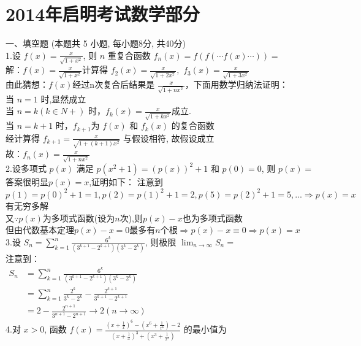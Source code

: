 \documentclass[a4paper,11pt,UTF8]{article}
\begin{document}
\section*{2014年启明考试数学部分}
\noindent
一、填空题 (本题共 5 小题, 每小题8分, 共40分)\\
1.设 $\displaystyle f(x)=\frac{x}{\sqrt{1+x^2}}$, 则 $n$ 重复合函数 $f_n(x)=f(f(\cdots f(x) \cdots))=$\\
解：$\displaystyle f(x)=\frac x{\sqrt{1+x^2}}$计算得 $\displaystyle f_2(x)=\frac x{\sqrt{1+2x^2}},$
$\displaystyle f_3(x)=\frac x{\sqrt{1+3x^2}}$\\
由此猜想：$f(x)$经过n次复合后结果是 $\displaystyle\frac x{\sqrt{1+nx^2}}$，下面用数学归纳法证明：\\
当 $n=1$ 时,显然成立\\
当 $n=k(k{\in}N+)$ 时，$\displaystyle f_k(x)=\frac x{\sqrt{1+kx^2}}$成立.\\
当 $n=k+1$ 时，$f_{k+1}$为 $f(x)$ 和 $f_{k}(x)$ 的复合函数\\
经计算得 $\displaystyle f_{k+1}=\frac{x}{\sqrt{1+(k+1)x^2}}$ 与假设相符,
故假设成立\\
故：$\displaystyle f_n(x)=\frac x{\sqrt{1+nx^2}}$\\
2.设多项式 $p(x)$ 满足 $p\left(x^2+1\right)=(p(x))^2+1$ 和 $p(0)=0$, 则 $p(x)=$\\
答案很明显$p(x)=x$,证明如下：
注意到$p(1)=p(0)^2+1=1,p(2)=p(1)^2+1=2,p(5)=p(2)^2+1=5,...\Rightarrow p(x)=x$有无穷多解\\
又$\because p(x)$为多项式函数(设为$n$次),则$p(x)-x$也为多项式函数\\
但由代数基本定理$p(x)-x=0$最多有$n$个根$\Rightarrow p(x)-x\equiv0\Rightarrow p(x)=x$\\
3.设 $\displaystyle S_n=\sum_{k=1}^n \frac{6^k}{\left(3^{k+1}-2^{k+1}\right)\left(3^k-2^k\right)}$, 则极限 $\displaystyle\lim _{n \rightarrow \infty} S_n=$\\
注意到：\\
$\begin{aligned}
	\displaystyle S_n&=\sum_{k=1}^n \frac{6^k}{\left(3^{k+1}-2^{k+1}\right)\left(3^k-2^k\right)}\\
	&=\sum_{k=1}^n\frac{2^k}{3^{k}-2^{k}}-\frac{2^{k+1}}{3^{k+1}-2^{k+1}}\\
	&=2-\frac{2^{n+1}}{3^{n+1}-2^{n+1}}\rightarrow2(n\to\infty)
\end{aligned}$\\
4.对 $x>0$, 函数 $\displaystyle f(x)=\frac{\left(x+\displaystyle\frac{1}{x}\right)^6-\left(x^6+\displaystyle\frac{1}{x^6}\right)-2}{\left(x+\displaystyle\frac{1}{x}\right)^3+\left(x^3+\displaystyle\frac{1}{x^3}\right)}$ 的最小值为\\
\end{document}

